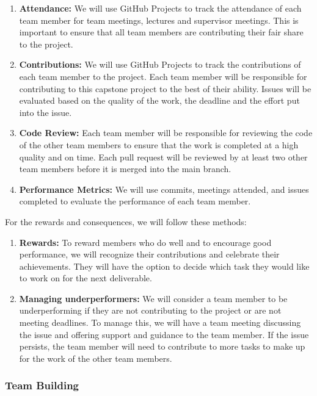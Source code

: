 \documentclass{article}
\begin{document}
\begin{enumerate}
  \item \textbf{Attendance:} We will use GitHub Projects to track the attendance of each team member for team meetings, lectures and supervisor meetings. This is important to ensure that all team members are contributing their fair share to the project.
  \item \textbf{Contributions:} We will use GitHub Projects to track the contributions of each team member to the project. Each team member will be responsible for contributing to this capstone project to the best of their ability. Issues will be evaluated based on the quality of the work, the deadline and the effort put into the issue.
  \item \textbf{Code Review:} Each team member will be responsible for reviewing the code of the other team members to ensure that the work is completed at a high quality and on time. Each pull request will be reviewed by at least two other team members before it is merged into the main branch.
  \item \textbf{Performance Metrics:} We will use commits, meetings attended, and issues completed to evaluate the performance of each team member.
\end{enumerate}

For the rewards and consequences, we will follow these methods:

\begin{enumerate}
  \item \textbf{Rewards:} To reward members who do well and to encourage good performance, we will recognize their contributions and celebrate their achievements. They will have the option to decide which task they would like to work on for the next deliverable.
  \item \textbf{Managing underperformers:} We will consider a team member to be underperforming if they are not contributing to the project or are not meeting deadlines. To manage this, we will have a team meeting discussing the issue and offering support and guidance to the team member. If the issue persists, the team member will need to contribute to more tasks to make up for the work of the other team members.
\end{enumerate}


\subsubsection*{Team Building}
\end{document}
